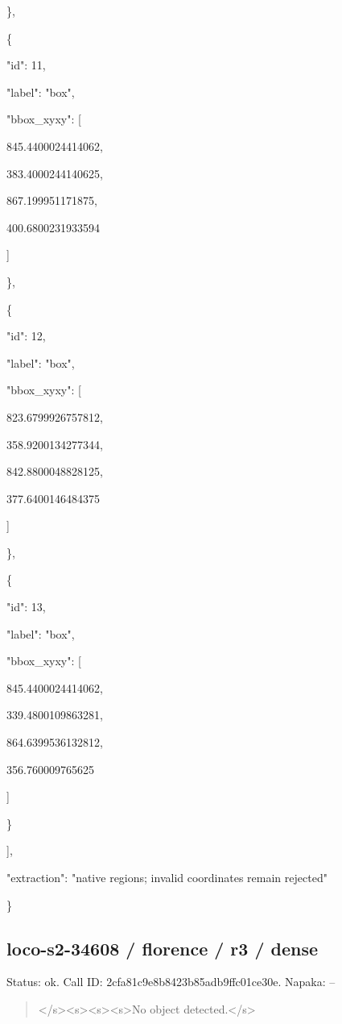 \documentclass[10pt,a4paper]{article}
\begin{document}
    \},\allowbreak{}\par
    \{\par
      "id":\allowbreak{} 11,\allowbreak{}\par
      "label":\allowbreak{} "box",\allowbreak{}\par
      "bbox\_xyxy":\allowbreak{} [\par
        845.4400024414062,\allowbreak{}\par
        383.4000244140625,\allowbreak{}\par
        867.199951171875,\allowbreak{}\par
        400.6800231933594\par
      ]\par
    \},\allowbreak{}\par
    \{\par
      "id":\allowbreak{} 12,\allowbreak{}\par
      "label":\allowbreak{} "box",\allowbreak{}\par
      "bbox\_xyxy":\allowbreak{} [\par
        823.6799926757812,\allowbreak{}\par
        358.9200134277344,\allowbreak{}\par
        842.8800048828125,\allowbreak{}\par
        377.6400146484375\par
      ]\par
    \},\allowbreak{}\par
    \{\par
      "id":\allowbreak{} 13,\allowbreak{}\par
      "label":\allowbreak{} "box",\allowbreak{}\par
      "bbox\_xyxy":\allowbreak{} [\par
        845.4400024414062,\allowbreak{}\par
        339.4800109863281,\allowbreak{}\par
        864.6399536132812,\allowbreak{}\par
        356.760009765625\par
      ]\par
    \}\par
  ],\allowbreak{}\par
  "extraction":\allowbreak{} "native regions; invalid coordinates remain rejected"\par
\}
\subsection*{loco-s2-34608 / florence / r3 / dense}
Status: ok. Call ID: 2cfa81c9e8b8423b85adb9ffc01ce30e. Napaka: --
\begin{quote}\footnotesize
</s>\allowbreak{}<s>\allowbreak{}<s>\allowbreak{}<s>\allowbreak{}No object detected.</s>\allowbreak{}
\end{quote}
\end{document}
